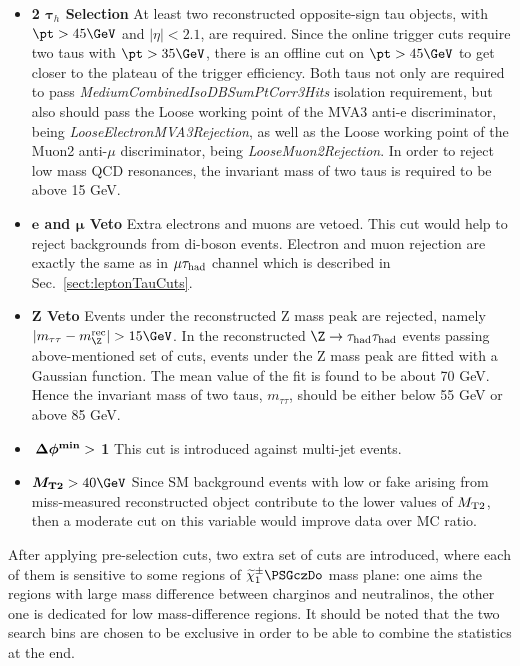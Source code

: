 \begin{itemize}
\item \textbf{2 $\boldsymbol\tau_h$ Selection} At least two reconstructed opposite-sign tau objects, 
with $\pt>45\GeV$ and $|\eta|<2.1$, are required. Since the online trigger cuts require two taus with 
$\pt>35\GeV$, there is an offline cut on $\pt>45\GeV$ to get closer to the plateau of the trigger efficiency. 
Both taus not only are required to pass \emph{MediumCombinedIsoDBSumPtCorr3Hits} isolation requirement, 
but also should pass the Loose working point of the MVA3 anti-e discriminator, being \emph{LooseElectronMVA3Rejection}, 
as well as the Loose working point of the Muon2 anti-$\mu$ discriminator, being \emph{LooseMuon2Rejection}. 
In order to reject low mass QCD resonances, the invariant mass of two taus is required to be above 15 GeV. 
\item \textbf{$\boldsymbol e$ and $\boldsymbol\mu$ Veto} Extra electrons and muons are vetoed. This 
cut would help to reject backgrounds from di-boson events. Electron and muon rejection 
are exactly the same as in $\mu\tau_{\rm had}$ channel which is described in Sec.~\ref{sect:leptonTauCuts}.
\item \textbf{Z Veto} Events under the reconstructed Z mass peak are rejected, namely $|m_{\tau\tau}-m_{\Z}^{\rm rec}|>15\GeV$. 
In the reconstructed $\Z\rightarrow \Tau\Tau$ events passing above-mentioned set of cuts, events under the Z mass peak are fitted 
with a Gaussian function. The mean value of the fit is found to be about 70 GeV. Hence the invariant mass of two taus, $m_{\tau\tau}$, should be 
either below 55 GeV or above 85 GeV.  
\item \textbf{$\boldsymbol{\,{\Delta\phi^{\rm min}}} > $ 1} This cut is introduced against multi-jet events.  
\item \textbf{$\boldsymbol\mttwo>40\GeV$} Since SM background events with low \MET or fake \MET arising from miss-measured reconstructed object
 contribute to the lower values of ${M_{\rm T2}}$, then a moderate cut on this variable would improve data over MC ratio.  
\end{itemize}
After applying pre-selection cuts, two extra set of cuts are introduced, where each of them is sensitive to some regions of $\chione\PSGczDo$ mass plane: one aims the regions with large mass difference between charginos and neutralinos, the other one is dedicated for low mass-difference regions. It should be noted that the two search bins are chosen to be exclusive in order to be able to combine the statistics at the end.

